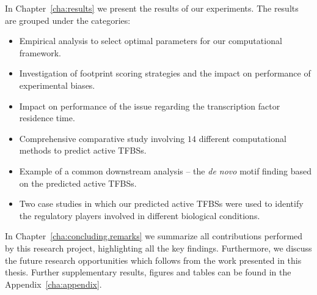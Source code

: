 In Chapter~\ref{cha:results} we present the results of our experiments. The results are grouped under the categories:
\begin{itemize}
\item Empirical analysis to select optimal parameters for our computational framework.
\item Investigation of footprint scoring strategies and the impact on performance of experimental biases.
\item Impact on performance of the issue regarding the transcription factor residence time.
\item Comprehensive comparative study involving $14$ different computational methods to predict active TFBSs.
\item Example of a common downstream analysis -- the \emph{de novo} motif finding based on the predicted active TFBSs.
\item Two case studies in which our predicted active TFBSs were used to identify the regulatory players involved in different biological conditions.
\end{itemize}

In Chapter~\ref{cha:concluding.remarks} we summarize all contributions performed by this research project, highlighting all the key findings. Furthermore, we discuss the future research opportunities which follows from the work presented in this thesis. Further supplementary results, figures and tables can be found in the Appendix~\ref{cha:appendix}.


